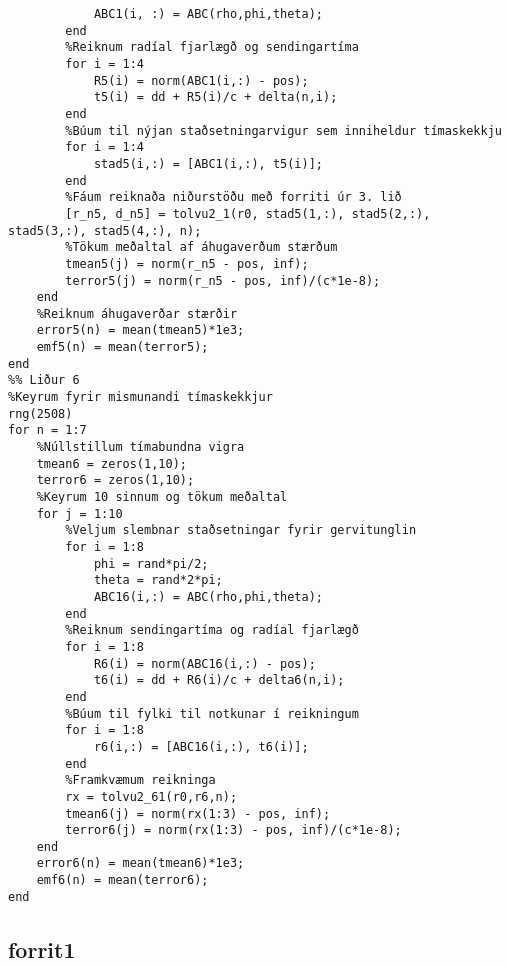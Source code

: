 \documentclass[11pt]{article}
\begin{document}
\begin{verbatim}
            ABC1(i, :) = ABC(rho,phi,theta);
        end
        %Reiknum radíal fjarlægð og sendingartíma
        for i = 1:4
            R5(i) = norm(ABC1(i,:) - pos);
            t5(i) = dd + R5(i)/c + delta(n,i);
        end
        %Búum til nýjan staðsetningarvigur sem inniheldur tímaskekkju
        for i = 1:4
            stad5(i,:) = [ABC1(i,:), t5(i)];
        end
        %Fáum reiknaða niðurstöðu með forriti úr 3. lið
        [r_n5, d_n5] = tolvu2_1(r0, stad5(1,:), stad5(2,:), stad5(3,:), stad5(4,:), n);
        %Tökum meðaltal af áhugaverðum stærðum
        tmean5(j) = norm(r_n5 - pos, inf);
        terror5(j) = norm(r_n5 - pos, inf)/(c*1e-8);
    end
    %Reiknum áhugaverðar stærðir
    error5(n) = mean(tmean5)*1e3;
    emf5(n) = mean(terror5);
end
%% Liður 6
%Keyrum fyrir mismunandi tímaskekkjur
rng(2508)
for n = 1:7
    %Núllstillum tímabundna vigra
    tmean6 = zeros(1,10);
    terror6 = zeros(1,10);
    %Keyrum 10 sinnum og tökum meðaltal
    for j = 1:10
        %Veljum slembnar staðsetningar fyrir gervitunglin
        for i = 1:8
            phi = rand*pi/2;
            theta = rand*2*pi;
            ABC16(i,:) = ABC(rho,phi,theta);
        end
        %Reiknum sendingartíma og radíal fjarlægð
        for i = 1:8
            R6(i) = norm(ABC16(i,:) - pos);
            t6(i) = dd + R6(i)/c + delta6(n,i);
        end
        %Búum til fylki til notkunar í reikningum
        for i = 1:8
            r6(i,:) = [ABC16(i,:), t6(i)];
        end
        %Framkvæmum reikninga
        rx = tolvu2_61(r0,r6,n);
        tmean6(j) = norm(rx(1:3) - pos, inf);
        terror6(j) = norm(rx(1:3) - pos, inf)/(c*1e-8);
    end
    error6(n) = mean(tmean6)*1e3;
    emf6(n) = mean(terror6);
end
\end{verbatim}

\subsection*{forrit1}
\end{document}
